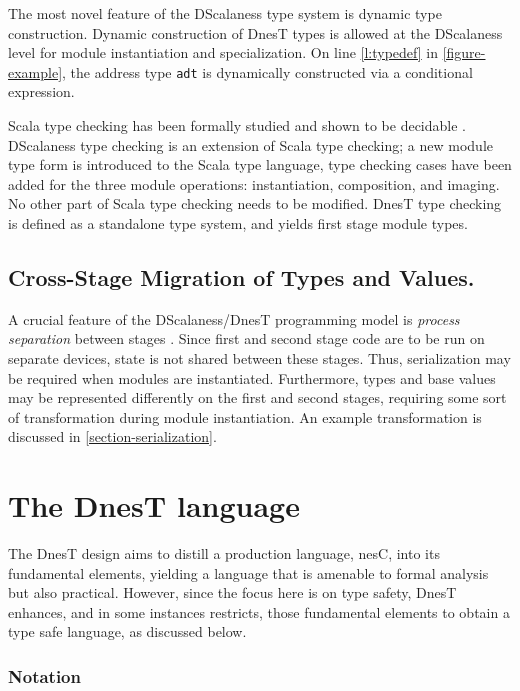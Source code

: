 The most novel feature of the DScalaness type system is dynamic type construction. Dynamic
construction of DnesT types is allowed at the DScalaness level for module instantiation and
specialization. On line \ref{l:typedef} in \autoref{figure-example}, the address type
\texttt{adt} is dynamically constructed via a conditional expression.

Scala type checking has been formally studied and shown to be decidable
\cite{Cremet:2006:CCS:2135978.2135980}. DScalaness type checking is an extension of Scala type
checking; a new module type form is introduced to the Scala type language, type checking cases
have been added for the three module operations: instantiation, composition, and imaging. No
other part of Scala type checking needs to be modified. DnesT type checking is defined as a
standalone type system, and yields first stage module types.

\subsection{Cross-Stage Migration of Types and Values.} 

A crucial feature of the DScalaness/DnesT programming model is \emph{process separation} between
stages \cite{FramedML}. Since first and second stage code are to be run on separate devices,
state is not shared between these stages. Thus, serialization may be required when modules are
instantiated. Furthermore, types and base values may be represented differently on the first and
second stages, requiring some sort of transformation during module instantiation. An example
transformation is discussed in \autoref{section-serialization}.

\section{The DnesT language}
\label{section-nest-theory}
 
The DnesT design aims to distill a production language, nesC, into its fundamental elements,
yielding a language that is amenable to formal analysis but also practical. However, since the
focus here is on type safety, DnesT enhances, and in some instances restricts, those fundamental
elements to obtain a type safe language, as discussed below.

\subsubsection{Notation}

